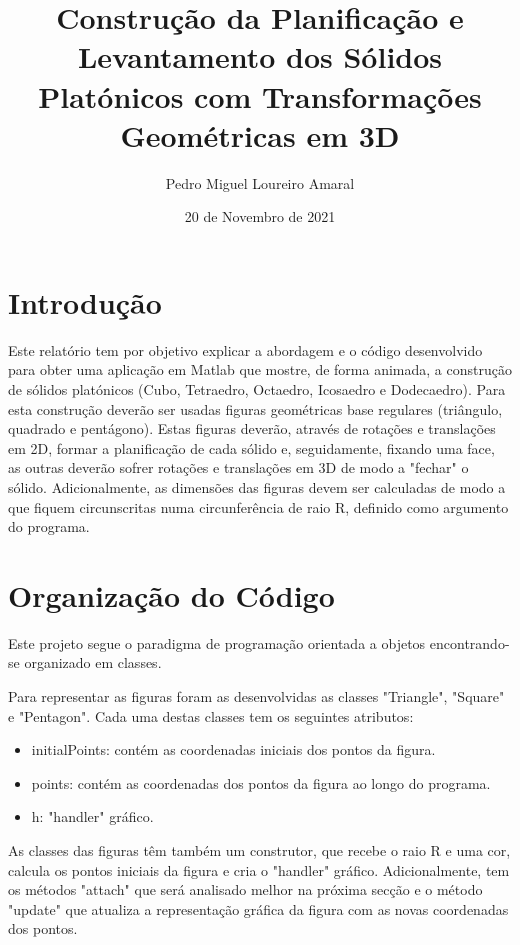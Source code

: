 \documentclass{report}
\title{Construção da Planificação e Levantamento dos Sólidos Platónicos com Transformações Geométricas em 3D}
\author{Pedro Miguel Loureiro Amaral}
\date{20 de Novembro de 2021}
\begin{document}
\maketitle

\renewcommand\thesection{\arabic{section}}

\section{Introdução}

\quad Este relatório tem por objetivo explicar a abordagem e o código desenvolvido para obter uma aplicação em Matlab que mostre, de forma animada, a construção de sólidos platónicos (Cubo, Tetraedro, Octaedro, Icosaedro e Dodecaedro). Para esta construção deverão ser usadas figuras geométricas base regulares (triângulo, quadrado e pentágono). Estas figuras deverão, através de rotações e translações em 2D, formar a planificação de cada sólido e, seguidamente, fixando uma face, as outras deverão sofrer rotações e translações em 3D de modo a "fechar" o sólido. Adicionalmente, as dimensões das figuras devem ser calculadas de modo a que fiquem circunscritas numa circunferência de raio R, definido como argumento do programa.

\section{Organização do Código}

\quad Este projeto segue o paradigma de programação orientada a objetos encontrando-se organizado em classes.

Para representar as figuras foram as desenvolvidas as classes "Triangle", "Square" e "Pentagon". Cada uma destas classes tem os seguintes atributos:
\begin{itemize}
    \setlength\itemsep{0.1em}
    \item initialPoints: contém as coordenadas iniciais dos pontos da figura.
    \item points: contém as coordenadas dos pontos da figura ao longo do programa.
    \item h: "handler" gráfico.
\end{itemize}

As classes das figuras têm também um construtor, que recebe o raio R e uma cor, calcula os pontos iniciais da figura e cria o "handler" gráfico. Adicionalmente, tem os métodos "attach" que será analisado melhor na próxima secção e o método "update" que atualiza a representação gráfica da figura com as novas coordenadas dos pontos.
\end{document}
